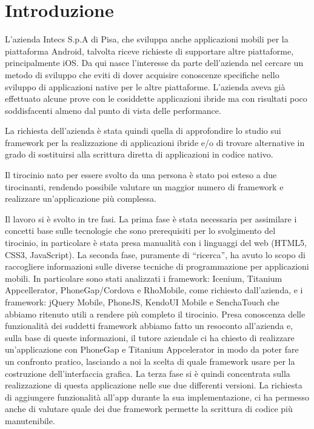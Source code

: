 \setcounter{page}{1}

\chapter{Introduzione}
	L'azienda Intecs S.p.A di Pisa, che sviluppa anche applicazioni mobili per la 
	piattaforma Android, talvolta riceve richieste di supportare altre piattaforme,
	principalmente iOS. Da qui nasce l'interesse da parte dell'azienda nel
	cercare un metodo di sviluppo \crossplat che eviti di dover acquisire 
	conoscenze specifiche nello sviluppo di applicazioni native per le altre 
	piattaforme. L'azienda aveva già effettuato alcune prove con le cosiddette
	applicazioni ibride ma con risultati poco soddisfacenti almeno dal punto di
	vista delle performance.
	
	La richiesta dell'azienda è stata quindi quella di approfondire lo studio sui
	framework per la realizzazione di applicazioni ibride e/o di trovare alternative
	in grado di sostituirsi alla scrittura diretta di applicazioni in codice 
	nativo.
	
	Il tirocinio nato per essere svolto da una persona è stato poi esteso a due
	tirocinanti, rendendo possibile valutare un maggior numero di framework e 
	realizzare un'applicazione più complessa.
	
	Il lavoro si è svolto in tre fasi. La prima fase è stata necessaria per 
	assimilare i concetti base sulle tecnologie che sono prerequisiti per lo 
	svolgimento del tirocinio, in particolare è stata presa manualità con i 
	linguaggi del web (HTML5, CSS3, JavaScript). La seconda fase, puramente di
	``ricerca'', ha avuto lo scopo di raccogliere informazioni sulle diverse 
	tecniche di programmazione per applicazioni mobili. In particolare sono 
	stati analizzati i framework: Icenium, Titanium Appcellerator, 
	PhoneGap/Cordova e RhoMobile, come richiesto dall'azienda, e i framework:
	jQuery Mobile, PhoneJS, KendoUI Mobile e SenchaTouch che abbiamo ritenuto
	utili a rendere più completo il tirocinio.
	Presa conoscenza delle funzionalità dei suddetti framework abbiamo fatto un
	resoconto all'azienda e, sulla base di queste informazioni, il tutore 
	aziendale ci ha chiesto di realizzare un'applicazione con PhoneGap e Titanium 
	Appcelerator in modo da poter fare un confronto pratico, lasciando a noi la
	scelta di quale framework usare per la costruzione dell'interfaccia grafica.
	La terza fase si è quindi concentrata sulla realizzazione di questa 
	applicazione nelle sue due differenti versioni. La richiesta di aggiungere
	funzionalità all'app durante la sua implementazione, ci ha permesso anche di 
	valutare quale dei due framework permette la scrittura di codice più 
	manutenibile.
	
